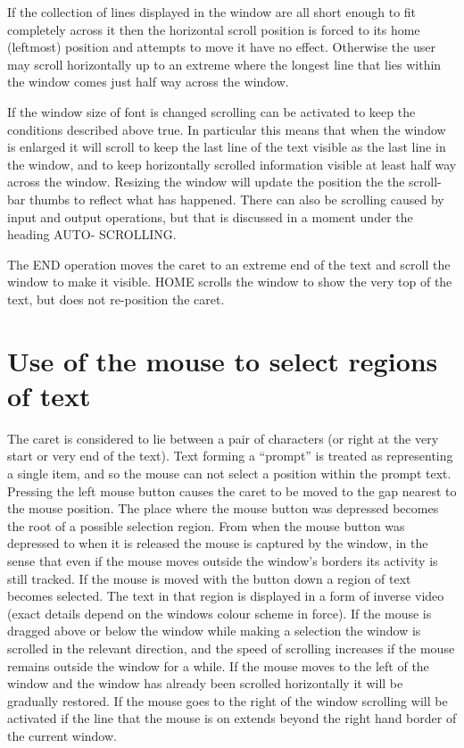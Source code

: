 \documentclass[a4paper,11pt]{article}
\begin{document}
If the collection of lines displayed in the window are all short enough
to fit completely across it then the horizontal scroll position is forced
to its home (leftmost) position and attempts to move it have no effect.
Otherwise the user may scroll horizontally up to an extreme where the
longest line that lies within the window comes just half way across the
window.

If the window size of font is changed scrolling can be activated to keep
the conditions described above true.  In particular this means that when
the window is enlarged it will scroll to keep the last line of the text
visible as the last line in the window, and to keep horizontally scrolled
information visible at least half way across the window. Resizing the
window will update the position the the scroll-bar thumbs to reflect
what has happened. There can also be scrolling caused by input and output
operations, but that is discussed in a moment under the heading AUTO-
SCROLLING.

The END operation moves the caret to an extreme end of the
text and scroll the window to make it visible.  HOME scrolls the window
to show the very top of the text, but does not re-position the caret.

\section{Use of the mouse to select regions of text}
The caret is considered to lie between a pair of characters (or right at
the very start or very end of the text). Text forming a ``prompt'' is treated
as representing a single item, and so the mouse can not select a position
within the prompt text. Pressing the left mouse button causes the caret to
be moved to the gap nearest to the mouse position. The place where the mouse
button was depressed becomes the root of a possible selection region.
From when the mouse button was depressed to when it is released the mouse
is captured by the window, in the sense that even if the mouse moves outside
the window's borders its activity is still tracked. If the mouse is moved
with the button down a region of text becomes selected. The text in that
region is displayed in a form of inverse video (exact details depend on the
windows colour scheme in force). If the mouse is dragged above or below the
window while making a selection the window is scrolled in the relevant
direction, and the speed of scrolling increases if the mouse remains outside
the window for a while.  If the mouse moves to the left of the window and
the window has already been scrolled horizontally it will be gradually
restored. If the mouse goes to the right of the window scrolling will be
activated if the line that the mouse is on extends beyond the right hand
border of the current window.
\end{document}
